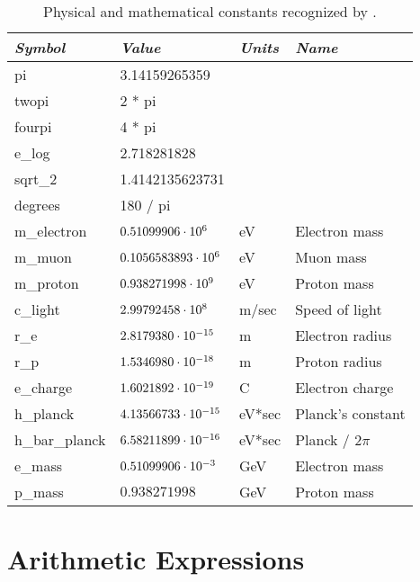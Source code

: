 {{\begin{table}
\centering
\begin{tabular}{|l|l|l|l|} \hline
  {\em Symbol}  & {\em Value}       & {\em Units} &  {\em Name}       \\ \hline
  pi            & 3.14159265359          &        &                   \\
  twopi         & 2 * pi                 &        &                   \\
  fourpi        & 4 * pi                 &        &                   \\
  e_log         & 2.718281828            &        &                   \\
  sqrt_2        & 1.4142135623731        &        &                   \\
  degrees       & 180 / pi               &        &                   \\
  m_electron    & $0.51099906 \cdot 10^{6}$   & eV     & Electron mass     \\
  m_muon        & $0.1056583893 \cdot 10^{6}$ & eV     & Muon mass         \\
  m_proton      & $0.938271998 \cdot 10^{9}$  & eV     & Proton mass       \\
  c_light       & $2.99792458 \cdot 10^{8}$   & m/sec  & Speed of light    \\
  r_e           & $2.8179380 \cdot 10^{-15}$  & m      & Electron radius   \\
  r_p           & $1.5346980 \cdot 10^{-18}$  & m      & Proton radius     \\
  e_charge      & $1.6021892 \cdot 10^{-19}$  & C      & Electron charge   \\
  h_planck      & $4.13566733 \cdot 10^{-15}$ & eV*sec & Planck's constant \\
  h_bar_planck  & $6.58211899 \cdot 10^{-16}$ & eV*sec & Planck / $2\pi$   \\
  e_mass        & $0.51099906 \cdot 10^{-3}$  & GeV    & Electron mass     \\
  p_mass        & $0.938271998$          & GeV    & Proton mass       \\ \hline
\end{tabular}
\caption{Physical and mathematical constants recognized by \bmad.}
\label{t:constants}
\end{table}

\section{Arithmetic Expressions}

}}
